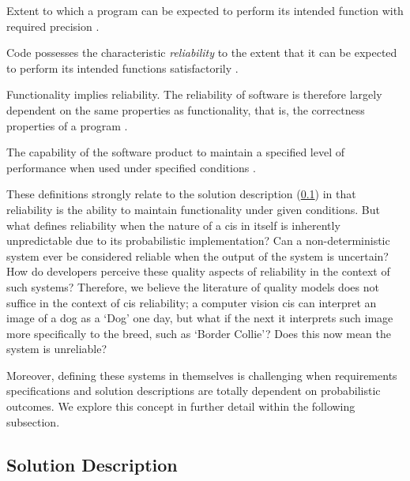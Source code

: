 \begin{description}[font=\itshape,style=multiline,leftmargin=3cm]
  \item[\citeauthor{McCall:1977uy}] Extent to which a program can be expected to perform its intended function with required precision \citep{McCall:1977uy}.
  \item[\citeauthor{Boehm:1978vv}] Code possesses the characteristic \textit{reliability} to the extent that it can be expected to perform its intended functions satisfactorily \citep{Boehm:1978vv}.
  \item[\citeauthor{Dromey:1995wy}] Functionality implies reliability. The reliability of software is therefore largely dependent on the same properties as functionality, that is, the correctness properties of a program \citep{Dromey:1995wy}.
  \item[ISO/IEC-9126] The capability of the software product to maintain a specified level of performance when used under specified conditions \citep{ISO9126:1999}.
\end{description}

These definitions strongly relate to the solution description (\cref{ssec:literature-review:software-quality:solution-description}) in that reliability is the ability to maintain functionality under given conditions. But what defines reliability when the nature of a \gls{cis} in itself is inherently unpredictable due to its probabilistic implementation? Can a non-deterministic system ever be considered reliable when the output of the system is uncertain? How do developers perceive these quality aspects of reliability in the context of such systems? Therefore, we believe the literature of quality models does not suffice in the context of \gls{cis} reliability; a computer vision \gls{cis} can interpret an image of a dog as a `Dog' one day, but what if the next it interprets such image more specifically to the breed, such as `Border Collie'? Does this now mean the system is unreliable? 

Moreover, defining these systems in themselves is challenging when requirements specifications and solution descriptions are totally dependent on probabilistic outcomes. We explore this concept in further detail within the following subsection.

\subsection{Solution Description}
\label{ssec:literature-review:software-quality:solution-description}